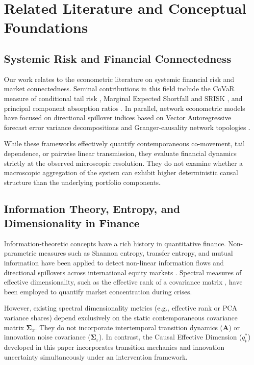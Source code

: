 \documentclass[review,12pt,authoryear]{elsarticle}
\begin{document}
\section{Related Literature and Conceptual Foundations}
\label{sec:literature}

\subsection{Systemic Risk and Financial Connectedness}
Our work relates to the econometric literature on systemic financial risk and market connectedness. Seminal contributions in this field include the CoVaR measure of conditional tail risk \citep{adrian2016covar}, Marginal Expected Shortfall and SRISK \citep{acharya2017measuring, brownlees2017srisk}, and principal component absorption ratios \citep{kritzman2011principal}. In parallel, network econometric models have focused on directional spillover indices based on Vector Autoregressive forecast error variance decompositions \citep{diebold2012better, diebold2014network} and Granger-causality network topologies \citep{billio2012econometric}.

While these frameworks effectively quantify contemporaneous co-movement, tail dependence, or pairwise linear transmission, they evaluate financial dynamics strictly at the observed microscopic resolution. They do not examine whether a macroscopic aggregation of the system can exhibit higher deterministic causal structure than the underlying portfolio components.

\subsection{Information Theory, Entropy, and Dimensionality in Finance}
Information-theoretic concepts have a rich history in quantitative finance. Non-parametric measures such as Shannon entropy, transfer entropy, and mutual information have been applied to detect non-linear information flows and directional spillovers across international equity markets \citep{schreiber2000measuring, dimpfl2013using}. Spectral measures of effective dimensionality, such as the effective rank of a covariance matrix \citep{roy2007effective}, have been employed to quantify market concentration during crises.

However, existing spectral dimensionality metrics (e.g., effective rank or PCA variance shares) depend exclusively on the static contemporaneous covariance matrix $\boldsymbol{\Sigma}_x$. They do not incorporate intertemporal transition dynamics ($\mathbf{A}$) or innovation noise covariance ($\boldsymbol{\Sigma}_\varepsilon$). In contrast, the Causal Effective Dimension ($q_t^*$) developed in this paper incorporates transition mechanics and innovation uncertainty simultaneously under an intervention framework.
\end{document}
